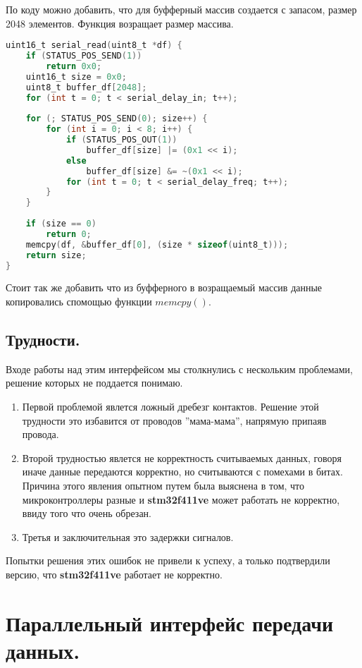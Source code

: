 \documentclass{bmstu}
\begin{document}
	По коду можно добавить, что для буфферный массив создается с запасом, размер 2048 элементов. Функция возращает размер массива.
	
	\begingroup
	\fontsize{12pt}{12pt}\selectfont
	\begin{lstlisting}[language=C, name=serial_transmission_c]
uint16_t serial_read(uint8_t *df) {
	if (STATUS_POS_SEND(1))
		return 0x0;
	uint16_t size = 0x0;
	uint8_t buffer_df[2048];
	for (int t = 0; t < serial_delay_in; t++);
	
	for (; STATUS_POS_SEND(0); size++) {
		for (int i = 0; i < 8; i++) {
			if (STATUS_POS_OUT(1))
				buffer_df[size] |= (0x1 << i);
			else
				buffer_df[size] &= ~(0x1 << i);
			for (int t = 0; t < serial_delay_freq; t++);
		}
	}
	
	if (size == 0)
		return 0;
	memcpy(df, &buffer_df[0], (size * sizeof(uint8_t)));
	return size;
}		
	\end{lstlisting}
	\endgroup
	
	Стоит так же добавить что из буфферного в возращаемый массив данные копировались спомощью функции $memcpy()$.
	
	\subsection{Трудности.}
	
	Входе работы над этим интерфейсом мы столкнулись с нескольким проблемами, решение которых не поддается понимаю. 
	
	\begin{enumerate}
		\item Первой проблемой явлется ложный дребезг контактов. Решение этой трудности это избавится от проводов ''мама-мама'', напрямую припаяв провода.
		\item Второй трудностью явлется не корректность считываемых данных, говоря иначе данные передаются корректно, но считываются с помехами в битах. 
		Причина этого явления опытном путем была выяснена в том, что микроконтроллеры разные и \textbf{stm32f411ve} может работать не корректно, ввиду того что очень обрезан.
		\item Третья и заключительная это задержки сигналов.
	\end{enumerate}

	Попытки решения этих ошибок не привели к успеху, а только подтвердили версию, что \textbf{stm32f411ve} работает не корректно.
	
	\section{Параллельный интерфейс передачи данных.}
	
\end{document}
